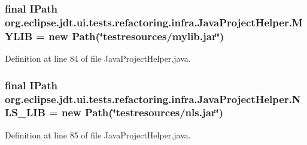 \hypertarget{classorg_1_1eclipse_1_1jdt_1_1ui_1_1tests_1_1refactoring_1_1infra_1_1JavaProjectHelper_aaf4b86adc0576d9e3eba268ab1afee22}{
\subsubsection[{MYLIB}]{\setlength{\rightskip}{0pt plus 5cm}final IPath {\bf org.eclipse.jdt.ui.tests.refactoring.infra.JavaProjectHelper.MYLIB} = new Path(\char`\"{}testresources/mylib.jar\char`\"{})}}
\label{classorg_1_1eclipse_1_1jdt_1_1ui_1_1tests_1_1refactoring_1_1infra_1_1JavaProjectHelper_aaf4b86adc0576d9e3eba268ab1afee22}


Definition at line 84 of file JavaProjectHelper.java.

\hypertarget{classorg_1_1eclipse_1_1jdt_1_1ui_1_1tests_1_1refactoring_1_1infra_1_1JavaProjectHelper_ab065fefae002b3356342e1ff056da45c}{
\subsubsection[{NLS\_\-LIB}]{\setlength{\rightskip}{0pt plus 5cm}final IPath {\bf org.eclipse.jdt.ui.tests.refactoring.infra.JavaProjectHelper.NLS\_\-LIB} = new Path(\char`\"{}testresources/nls.jar\char`\"{})}}
\label{classorg_1_1eclipse_1_1jdt_1_1ui_1_1tests_1_1refactoring_1_1infra_1_1JavaProjectHelper_ab065fefae002b3356342e1ff056da45c}


Definition at line 85 of file JavaProjectHelper.java.

